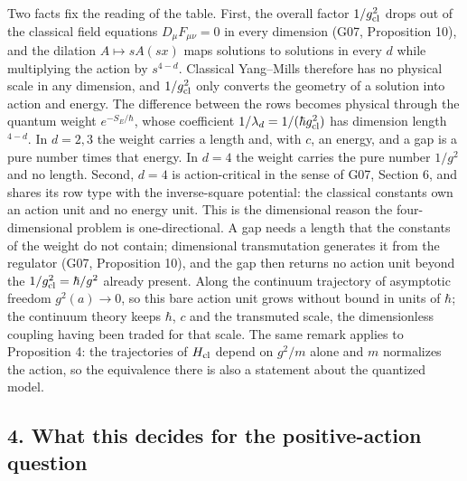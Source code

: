 \documentclass[11pt,a4paper]{article}
\begin{document}
Two facts fix the reading of the table. First, the overall factor
\(1/g_{\rm cl}^2\) drops out of the classical field equations
\(D_\mu F_{\mu\nu}=0\) in every dimension (G07, Proposition 10), and the
dilation \(A\mapsto sA(sx)\) maps solutions to solutions in every \(d\)
while multiplying the action by \(s^{4-d}\). Classical Yang--Mills
therefore has no physical scale in any dimension, and \(1/g_{\rm cl}^2\)
only converts the geometry of a solution into action and energy. The
difference between the rows becomes physical through the quantum weight
\(e^{-S_E/\hbar}\), whose coefficient
\(1/\lambda_d=1/(\hbar g_{\rm cl}^2)\) has dimension length\(^{4-d}\).
In \(d=2,3\) the weight carries a length and, with \(c\), an energy, and
a gap is a pure number times that energy. In \(d=4\) the weight carries
the pure number \(1/g^2\) and no length. Second, \(d=4\) is
action-critical in the sense of G07, Section 6, and shares its row type
with the inverse-square potential: the classical constants own an action
unit and no energy unit. This is the dimensional reason the
four-dimensional problem is one-directional. A gap needs a length that
the constants of the weight do not contain; dimensional transmutation
generates it from the regulator (G07, Proposition 10), and the gap then
returns no action unit beyond the \(1/g_{\rm cl}^2=\hbar/g^2\) already
present. Along the continuum trajectory of asymptotic freedom
\(g^2(a)\to0\), so this bare action unit grows without bound in units of
\(\hbar\); the continuum theory keeps \(\hbar\), \(c\) and the
transmuted scale, the dimensionless coupling having been traded for that
scale. The same remark applies to Proposition 4: the trajectories of
\(H_{\rm cl}\) depend on \(g^2/m\) alone and \(m\) normalizes the
action, so the equivalence there is also a statement about the quantized
model.

\subsection{4. What this decides for the positive-action
question}\label{what-this-decides-for-the-positive-action-question}
\end{document}
